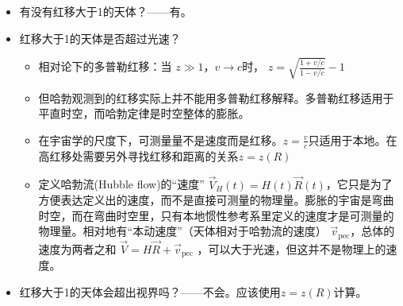 \documentclass[]{ctexart}
\begin{document}
\begin{itemize}
    \item 有没有红移大于1的天体？——有。
    \item 红移大于1的天体是否超过光速？
    \begin{itemize}
        \item 相对论下的多普勒红移：当 $z\gg 1$，$v\rightarrow c$时， $z=\sqrt{\frac{1+v/c}{1-v/c}}-1$ 
        \item 但哈勃观测到的红移实际上并不能用多普勒红移解释。多普勒红移适用于平直时空，而哈勃定律是时空整体的膨胀。
        \item 在宇宙学的尺度下，可测量量不是速度而是红移。$z=\frac{v}{c}$只适用于本地。在高红移处需要另外寻找红移和距离的关系$z=z(R)$
        \item 定义哈勃流(Hubble flow)的“速度” $\vec{V}_H(t)=H(t) \vec{R}(t)$，它只是为了方便表达定义出的速度，而不是直接可测量的物理量。膨胀的宇宙是弯曲时空，而在弯曲时空里，只有本地惯性参考系里定义的速度才是可测量的物理量。相对地有“本动速度”（天体相对于哈勃流的速度） $\vec{v}_\text{pec}$，总体的速度为两者之和 $\vec{V} = H\vec{R}+\vec{v}_\text{pec}$ ，可以大于光速，但这并不是物理上的速度。
    \end{itemize}
    \item 红移大于1的天体会超出视界吗？——不会。应该使用$z=z(R)$计算。
\end{itemize}
\end{document}
